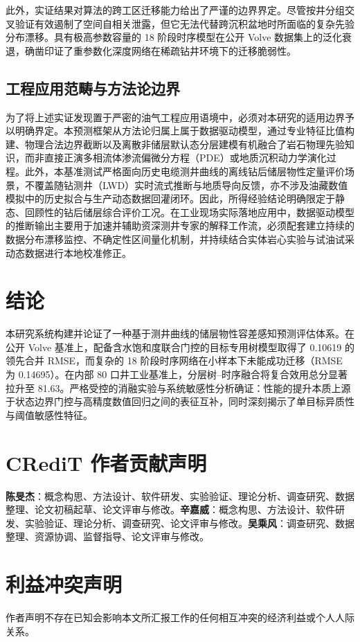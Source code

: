 \documentclass[preprint,12pt,nopreprintline]{elsarticle}
\begin{document}
此外，实证结果对算法的跨工区迁移能力给出了严谨的边界界定。尽管按井分组交叉验证有效遏制了空间自相关泄露，但它无法代替跨沉积盆地时所面临的复杂先验分布漂移。具有极高参数容量的 18 阶段时序模型在公开 Volve 数据集上的泛化衰退，确凿印证了重参数化深度网络在稀疏钻井环境下的迁移脆弱性。

\subsection{工程应用范畴与方法论边界}
为了将上述实证发现置于严密的油气工程应用语境中，必须对本研究的适用边界予以明确界定。本预测框架从方法论归属上属于数据驱动模型，通过专业特征比值构建、物理合法边界截断以及离散非储层默认态分层建模有机融合了岩石物理先验知识，而非直接正演多相流体渗流偏微分方程（PDE）或地质沉积动力学演化过程。此外，本基准测试严格面向历史电缆测井曲线的离线钻后储层物性定量评价场景，不覆盖随钻测井（LWD）实时流式推断与地质导向反馈，亦不涉及油藏数值模拟中的历史拟合与生产动态数据回灌闭环。因此，所得经验结论明确限定于静态、回顾性的钻后储层综合评价工况。在工业现场实际落地应用中，数据驱动模型的推断输出主要用于加速并辅助资深测井专家的解释工作流，必须配套建立持续的数据分布漂移监控、不确定性区间量化机制，并持续结合实体岩心实验与试油试采动态数据进行本地校准修正。

\section{结论}
\label{sec:conclusions}
本研究系统构建并论证了一种基于测井曲线的储层物性容差感知预测评估体系。在公开 Volve 基准上，配备含水饱和度联合门控的目标专用树模型取得了 0.10619 的领先合并 RMSE，而复杂的 18 阶段时序网络在小样本下未能成功迁移（RMSE 为 0.14695）。在内部 80 口井工业基准上，分层树--时序融合将复合效用总分显著拉升至 81.63。严格受控的消融实验与系统敏感性分析确证：性能的提升本质上源于状态边界门控与高精度数值回归之间的表征互补，同时深刻揭示了单目标异质性与阈值敏感性特征。

\section*{CRediT 作者贡献声明}
\textbf{陈旻杰}：概念构思、方法设计、软件研发、实验验证、理论分析、调查研究、数据整理、论文初稿起草、论文评审与修改。\textbf{辛嘉威}：概念构思、方法设计、软件研发、实验验证、理论分析、调查研究、论文评审与修改。\textbf{吴乘风}：调查研究、数据整理、资源协调、监督指导、论文评审与修改。

\section*{利益冲突声明}
作者声明不存在已知会影响本文所汇报工作的任何相互冲突的经济利益或个人人际关系。
\end{document}
